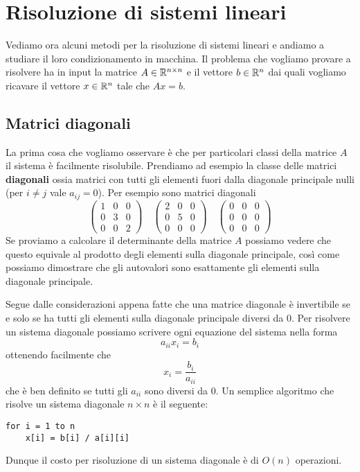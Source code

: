 \section{Risoluzione di sistemi lineari}
Vediamo ora alcuni metodi per la risoluzione di sistemi lineari e andiamo a studiare il loro condizionamento
in macchina. Il problema che vogliamo provare a risolvere ha in input la matrice $A \in \mathbb{R}^{n \times n}$ e il
vettore $b \in \mathbb{R}^n$ dai quali vogliamo ricavare il vettore $x \in \mathbb{R}^n$ tale che $A x = b$.

\subsection{Matrici diagonali}
La prima cosa che vogliamo osservare è che per particolari classi della matrice $A$ il sistema è facilmente
risolubile. Prendiamo ad esempio la classe delle matrici \textbf{diagonali} ossia matrici con tutti gli elementi
fuori dalla diagonale principale nulli (per $i \neq j$ vale $a_{ij} = 0$). Per esempio sono matrici diagonali
\[
	\begin{pmatrix}
		1 & 0 & 0 \\
		0 & 3 & 0 \\
		0 & 0 & 2
	\end{pmatrix} \quad
	\begin{pmatrix}
		2 & 0 & 0 \\
		0 & 5 & 0 \\
		0 & 0 & 0
	\end{pmatrix} \quad
	\begin{pmatrix}
		0 & 0 & 0 \\
		0 & 0 & 0 \\
		0 & 0 & 0
	\end{pmatrix}
\]
Se proviamo a calcolare il determinante della matrice $A$ possiamo vedere che questo equivale al prodotto degli
elementi sulla diagonale principale, così come possiamo dimostrare che gli autovalori sono esattamente gli
elementi sulla diagonale principale.

Segue dalle considerazioni appena fatte che una matrice diagonale è invertibile se e solo se ha tutti gli elementi
sulla diagonale principale diversi da 0. Per risolvere un sistema diagonale possiamo scrivere ogni equazione del
sistema nella forma
\[ a_{ii} x_i = b_i \]
ottenendo facilmente che
\[ x_i = \frac{b_i}{a_{ii}} \]
che è ben definito se tutti gli $a_{ii}$ sono diversi da 0. Un semplice algoritmo che risolve un sistema diagonale
$n \times n$ è il seguente:
\begin{lstlisting}[language=pseudo, style=pseudo-style]
for i = 1 to n
	x[i] = b[i] / a[i][i]
\end{lstlisting}
Dunque il costo per risoluzione di un sistema diagonale è di $O(n)$ operazioni.

